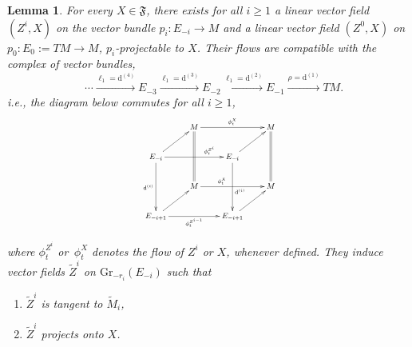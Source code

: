 \documentclass[10pt]{article}
\theoremstyle{plain}
\newtheorem{lemma}{Lemma}[section]
\theoremstyle{definition}
\theoremstyle{remark}
\newcommand{\dd}{\mathrm{d}}
\newcommand{\E}{\mathcal{E}}
\begin{document}
\begin{lemma}
 \label{prop:lift-on-blowup}
For every $X\in \mathfrak F$, there exists for all $i\geq 1$  a  linear vector field $(Z^i,X)$ on the vector bundle $p_i\colon E_{-i}\longrightarrow M$ and a linear vector field $(Z^0,X)$ on  $p_0\colon E_0:=TM\longrightarrow M$, $p_i$-projectable to $X$. Their flows are compatible with the
complex of vector bundles, 
\begin{equation}
    \quad\cdots \stackrel{\ell_1=\dd^{(4)}} \longrightarrow E_{-3} \stackrel{\ell_1=\dd^{(3)}}{\longrightarrow} E_{-2} \stackrel{\ell_1=\dd^{(2)}}{\longrightarrow} E_{-1} \stackrel{\rho=\dd^{(1)}}{\longrightarrow} TM.\end{equation}
i.e., 
the diagram below commutes for all $i\geq 1$,
\begin{equation}\label{cube:diagram}
  \scalebox{0.7}{\hbox{
  \xymatrix{
& M \ar[rr]^{\phi^X_t} \ar@{<-}[dl]\ar@{=}'[dd]
& & M \ar@{=}[dd]\ar@{<-}[dl]
\\
E_{-i}\ar[rr]^>>>>>>>{\phi_t^{Z^i}} \ar[dd]_-{\dd^{(i)}}
& & E_{-i} \ar[dd]^<<<<<<<<<<<<<{\dd^{(i)}}
\\
& M \ar[rr]^>>>>>>>>>>>>>>>>>>>{\phi^X_t} \ar@{<-}[dl]
& & M \ar@{<-}[dl]
\\E_{-i+1}\ar[rr]_{\phi^{Z^{i-1}}_t} & & E_{-i+1}
}}}
\end{equation}

   

where $\phi^{Z^i}_t$ or $\,\phi^{X}_t$ denotes the flow of $Z^i$ or $X$, whenever defined. They induce  vector fields  ${\widetilde Z}^i$ on $\mathrm{Gr}_{-r_i}(E_{-i})$ such that
\begin{enumerate}
    \item ${\widetilde Z}^i$ is tangent to $\widetilde M_i$,
    \item ${\widetilde Z}^i$ projects onto $X$.
\end{enumerate}

 \end{lemma}
\end{document}

